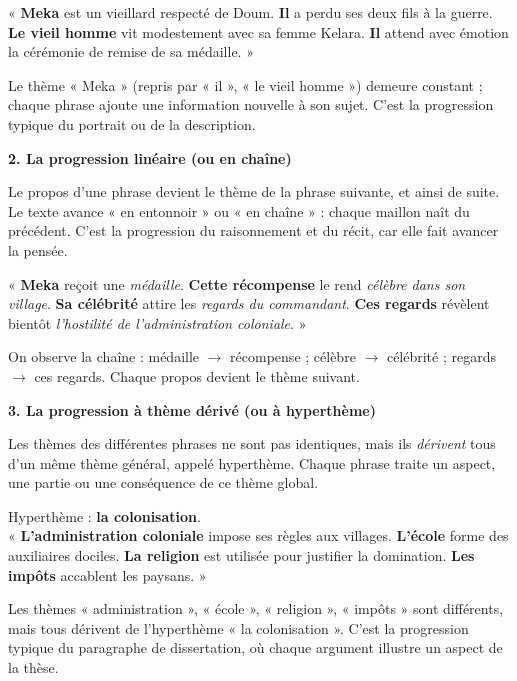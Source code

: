 \documentclass[11pt]{article}
\newcommand{\cle}[1]{{\popxbold\color{popdark}#1}}
\begin{document}
\begin{exemplebox}
« \textbf{Meka} est un vieillard respecté de Doum. \textbf{Il} a perdu ses deux fils à la guerre. \textbf{Le vieil homme} vit modestement avec sa femme Kelara. \textbf{Il} attend avec émotion la cérémonie de remise de sa médaille. »

Le thème « Meka » (repris par « il », « le vieil homme ») demeure constant ; chaque phrase ajoute une information nouvelle à son sujet. C'est la progression typique du portrait ou de la description.
\end{exemplebox}

\textbf{2. La progression linéaire (ou en chaîne)}\par
Le propos d'une phrase devient le thème de la phrase suivante, et ainsi de suite. Le texte avance « en entonnoir » ou « en chaîne » : chaque maillon naît du précédent. C'est la progression du raisonnement et du récit, car elle fait avancer la pensée.

\begin{exemplebox}
« \textbf{Meka} reçoit une \emph{médaille}. \textbf{Cette récompense} le rend \emph{célèbre dans son village}. \textbf{Sa célébrité} attire les \emph{regards du commandant}. \textbf{Ces regards} révèlent bientôt \emph{l'hostilité de l'administration coloniale}. »

On observe la chaîne : médaille $\rightarrow$ récompense ; célèbre $\rightarrow$ célébrité ; regards $\rightarrow$ ces regards. Chaque propos devient le thème suivant.
\end{exemplebox}

\textbf{3. La progression à thème dérivé (ou à hyperthème)}\par
Les thèmes des différentes phrases ne sont pas identiques, mais ils \emph{dérivent} tous d'un même thème général, appelé \cle{hyperthème}. Chaque phrase traite un aspect, une partie ou une conséquence de ce thème global.

\begin{exemplebox}
Hyperthème : \textbf{la colonisation}. \\
« \textbf{L'administration coloniale} impose ses règles aux villages. \textbf{L'école} forme des auxiliaires dociles. \textbf{La religion} est utilisée pour justifier la domination. \textbf{Les impôts} accablent les paysans. »

Les thèmes « administration », « école », « religion », « impôts » sont différents, mais tous dérivent de l'hyperthème « la colonisation ». C'est la progression typique du paragraphe de dissertation, où chaque argument illustre un aspect de la thèse.
\end{exemplebox}
\end{document}
